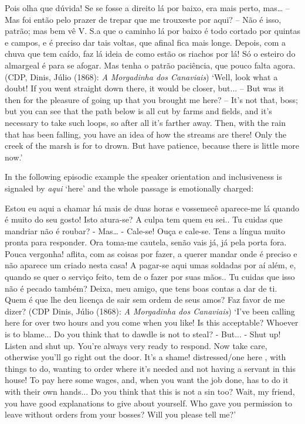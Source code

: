 \documentclass[output=paper]{langscibook}
\begin{document}
\eanoraggedright\label{ex:amaral:28}
Pois olha que dúvida! Se se fosse a direito lá por baixo, era mais perto, mas… – Mas foi então pelo prazer de trepar que me trouxeste por aqui? – Não é isso, patrão; mas bem vê V. S.a que o caminho lá por baixo é todo cortado por quintas e campos, e é preciso dar tais voltas, que afinal fica mais longe. Depois, com a chuva que tem caído, faz lá ideia de como estão os riachos por lá! Só o esteiro do almargeal é para  se afogar. Mas tenha o patrão paciência, que pouco falta agora. (CDP, Dinis, Júlio (1868): \textit{A Morgadinha dos Canaviais})
\glt ‘Well, look what a doubt! If you went straight down there, it would be closer, but... -- But was it then for the pleasure of going up that you brought me here? – It’s not that, boss; but you can see that the path below is all cut by farms and fields, and it’s necessary to take such loops, so after all it’s farther away. Then, with the rain that has been falling, you have an idea of how the streams are there! Only the creek of the marsh is for  to drown. But have patience, because there is little more now.’
\z 


In the following episodic example the speaker orientation and inclusiveness is signaled by \textit{aqui} ‘here’ and the whole passage is emotionally charged:



\eanoraggedright\label{ex:amaral:29}
Estou eu aqui a chamar há mais de duas horas e vossemecê aparece-me lá quando é muito do seu gosto! Isto atura-se? A culpa tem quem eu sei.. Tu cuidas que mandriar não é roubar? - Mas… - Cale-se! Ouça e cale-se. Tens a língua muito pronta para responder. Ora toma-me cautela, senão vais já, já pela porta fora. Pouca vergonha!  aflita, com as coisas por fazer, a querer mandar onde é preciso e não aparece um criado nesta casa! A pagar-se aqui umas soldadas por aí além, e, quando se quer o serviço feito, tem  de o fazer por suas mãos.. Tu cuidas que isso não é pecado também? Deixa, meu amigo, que tens boas contas a dar de ti. Quem é que lhe deu licença de sair sem ordem de seus amos? Faz favor de me dizer? (CDP Dinis, Júlio (1868): \textit{A Morgadinha dos Canaviais})
\glt ‘I’ve been calling here for over two hours and you come when you like! Is this acceptable? Whoever is to blame... Do you think that to dawdle is not to steal? - But... - Shut up! Listen and shut up. You’re always very ready to respond. Now take care, otherwise you’ll go right out the door. It’s a shame!  distressed/one here , with things to do, wanting to order where it’s needed and not having a servant in this house! To pay here some wages, and, when you want the job done,  has to do it with their own hands... Do you think that this is not a sin too? Wait, my friend, you have good explanations to give about yourself. Who gave you permission to leave without orders from your bosses? Will you please tell me?’
\z 
\end{document}
